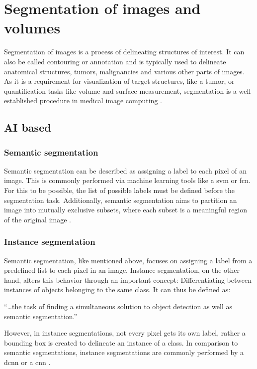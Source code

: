 \pagebreak
\section{Segmentation of images and volumes}\label{s:b-segmentation-basics}
Segmentation of images is a process of delineating structures of interest.
It can also be called contouring or annotation and is typically used to delineate anatomical structures, tumors,
malignancies and various other parts of images.
As it is a requirement for visualization of target structures, like a tumor, or quantification tasks like volume and surface measurement,
segmentation is a well-established procedure in medical image computing \cite{pinterPolymorphSegmentationRepresentation2019,slicercommunity3DSlicerImage2022}.

\subsection{AI based}\label{s:b-seg-ai}

\subsubsection{Semantic segmentation}
Semantic segmentation can be described as assigning a label to each pixel of an image.
This is commonly performed via machine learning tools like a \acrfull{svm} or \acrfull{fcn}.
For this to be possible, the list of possible labels must be defined before the segmentation task.
Additionally, semantic segmentation aims to partition an image into mutually exclusive subsets,
where each subset is a meaningful region of the original image \cite{haoBriefSurveySemantic2020,longFullyConvolutionalNetworks2015}.

\subsubsection{Instance segmentation}
Semantic segmentation, like mentioned above, focuses on assigning a label from a predefined list to each pixel in an image.
Instance segmentation, on the other hand, alters this behavior through an important concept:
Differentiating between instances of objects belonging to the same class.
It can thus be defined as:
\begin{displayquote}
	``\ldots\space the task of finding a simultaneous solution to object detection as well as semantic segmentation.''
\end{displayquote}
However, in instance segmentations, not every pixel gets its own label, rather a bounding box is created to delineate an instance of a class.
In comparison to semantic segmentations, instance segmentations are commonly performed by a \acrfull{dcnn} or a \acrfull{cnn} \cite{hafizSurveyInstanceSegmentation2020,chenMaskLabInstanceSegmentation2018}.

